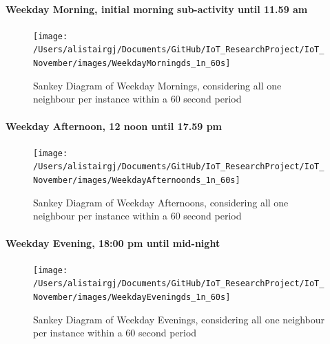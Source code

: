 \documentclass[11pt,]{article}
\let\oldparagraph\paragraph
\renewcommand{\paragraph}[1]{\oldparagraph{#1}\mbox{}}
\begin{document}
\hypertarget{weekday-morning-initial-morning-sub-activity-until-11.59-am}{%
\paragraph{Weekday Morning, initial morning sub-activity until 11.59
am}\label{weekday-morning-initial-morning-sub-activity-until-11.59-am}}

\begin{figure}[H]

{\centering \texttt{[image: /Users/alistairgj/Documents/GitHub/IoT\_ResearchProject/IoT\_November/images/WeekdayMorningds\_1n\_60s]} 

}

\caption{Sankey Diagram of Weekday Mornings, considering all one neighbour per instance within a 60 second period}\label{fig:sankey_WeekdayMorningds_1n_60s}
\end{figure}

\pagebreak

\hypertarget{weekday-afternoon-12-noon-until-17.59-pm}{%
\paragraph{Weekday Afternoon, 12 noon until 17.59
pm}\label{weekday-afternoon-12-noon-until-17.59-pm}}

\begin{figure}[H]

{\centering \texttt{[image: /Users/alistairgj/Documents/GitHub/IoT\_ResearchProject/IoT\_November/images/WeekdayAfternoonds\_1n\_60s]} 

}

\caption{Sankey Diagram of Weekday Afternoons, considering all one neighbour per instance within a 60 second period}\label{fig:sankey_WeekdayAfternoonds_1n_60s}
\end{figure}

\hypertarget{weekday-evening-1800-pm-until-mid-night}{%
\paragraph{Weekday Evening, 18:00 pm until
mid-night}\label{weekday-evening-1800-pm-until-mid-night}}

\begin{figure}[H]

{\centering \texttt{[image: /Users/alistairgj/Documents/GitHub/IoT\_ResearchProject/IoT\_November/images/WeekdayEveningds\_1n\_60s]} 

}

\caption{Sankey Diagram of Weekday Evenings, considering all one neighbour per instance within a 60 second period}\label{fig:sankey_WeekdayEveningds_1n_60s}
\end{figure}
\end{document}
